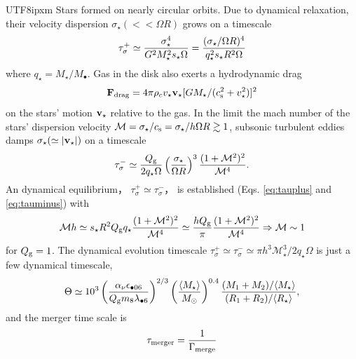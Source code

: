 \documentclass[linenumbers,trackchanges]{aastex701}
\begin{document}
\begin{CJK*}{UTF8}{ipxm}
Stars formed on nearly circular orbits.  Due to dynamical
relaxation\citep{palmer1993, aarseth1993},  
their velocity dispersion $\sigma_\star (< < \Omega R)$ 
grows on a timescale 
\begin{equation}
    \tau_\sigma^+ \simeq {\sigma_\star ^4 \over G^2 M_\star^2 s_\star \Omega} 
    ={(\sigma_\star/\Omega R)^4 \over 
    q_\star^2 s_\star R^2 \Omega}
\label{eq:tauplus}
\end{equation}
where $q_\star=M_\star/M_\bullet$.  
Gas in the disk also exerts a hydrodynamic drag 
\begin{equation}
{\bf F}_{\rm drag}=
4 \pi \rho_c v_\star {\bf v}_\star
[G M_\star / (c_{\rm s}^2 + v_\star^2)]^2
\end{equation}
on the stars' motion ${\bf v}_\star$ relative to 
the gas. In the limit the mach number of the stars'
dispersion velocity ${\mathcal M} =\sigma_\star/c_{\rm s} = 
\sigma_\star/ h \Omega R \gtrsim 1$, subsonic 
turbulent eddies damps $\sigma_\star (\simeq 
\vert {\bf v}_\star \vert)$ on a timescale 
\begin{equation}
    \tau_\sigma ^- 
    \simeq {Q_{\rm g} \over 2 q_\star \Omega} 
    \left( {\sigma_\star \over \Omega R} \right)^3 
    {(1 + {\mathcal M}^2)^2 \over 
    {\mathcal M}^4 }.
    \label{eq:tauminus}
\end{equation}
An dynamical equilibrium， $\tau_\sigma^+ \simeq \tau_\sigma ^-$， 
is established (Eqs. \ref{eq:tauplus} and \ref{eq:tauminus}) with
\begin{equation}
    {\mathcal M} h
    \simeq s_\star R^2 {Q_{\rm g}  q_\star} {(1 + {\mathcal M}^2)^2 \over 
    {\mathcal M}^4} \simeq {h Q_{\rm g} \over \pi} {(1 + {\mathcal M}^2)^2 \over 
    {\mathcal M}^4} \Rightarrow {\mathcal M} \sim 1
    \label{eq:sigmavk}
\end{equation}
for $Q_{\rm g}=1$.  The dynamical evolution timescale 
$\tau_\sigma ^+  \simeq \tau_\sigma ^- \simeq \pi h^3 
{\mathcal M}_\star^3/2 q_\star \Omega$ is just a few dynamical timescale,
\begin{equation}
    \Theta \simeq 10^3 \left( {\alpha_\nu \epsilon_{\bullet06} 
    \over Q_{\rm g} m_8 \lambda_{\bullet 6}} \right)^{2/3} \left( 
    {\langle M_\star \rangle \over M_\odot} \right)^{0.4}
    {(M_1+M_2)/\langle M_\star \rangle \over 
     (R_1+R_2)/\langle R_\star \rangle},
\end{equation}
and the merger time scale is 
\begin{equation}
    \tau_{\rm merger}={1 \over \Gamma_{\rm merge}} 

\end{equation}
\end{CJK*}
\end{document}
